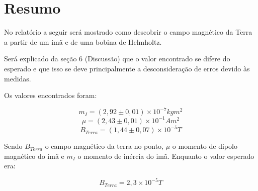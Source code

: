 \section{Resumo}
    No relatório a seguir será mostrado como descobrir o campo magnético da
    Terra a partir de um imã e de uma bobina de Helmholtz.

    Será explicado da seção 6 (Discussão) que o valor encontrado se difere
    do esperado e que isso se deve principalmente a desconsideração de 
    erros devido às medidas.

    Os valores encontrados foram:

    $$m_I = (2,92 \pm 0,01) \times 10^{-7} kg m^2$$
    $$\mu = (2,43 \pm 0,01) \times 10^{-1} A m^2$$
    $$B_{Terra} = (1,44 \pm 0,07) \times 10^{-5} T$$

    Sendo $B_{Terra}$ o campo magnético da terra no ponto,
    $\mu$ o momento de dipolo magnético do ímã e 
    $m_I$ o momento de inércia do imã.
    Enquanto o valor esperado era:
    
    $$B_{Terra} = 2,3 \times 10^{-5} T$$
